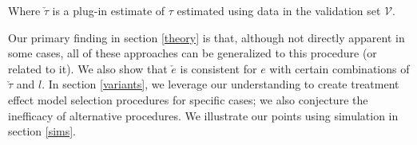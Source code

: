 Where $\check \tau$ is a plug-in estimate of $\tau$ estimated using data in the validation set $\mathcal{V}$. 

Our primary finding in section \ref{theory} is that, although not directly apparent in some cases, all of these approaches can be generalized to this procedure (or related to it). We also show that $\check e$ is consistent for $e$ with certain combinations of $\check\tau$ and $l$. In section \ref{variants}, we leverage our understanding to create treatment effect model selection procedures for specific cases;  we also conjecture the inefficacy of alternative procedures. We illustrate our points using simulation in section \ref{sims}.
